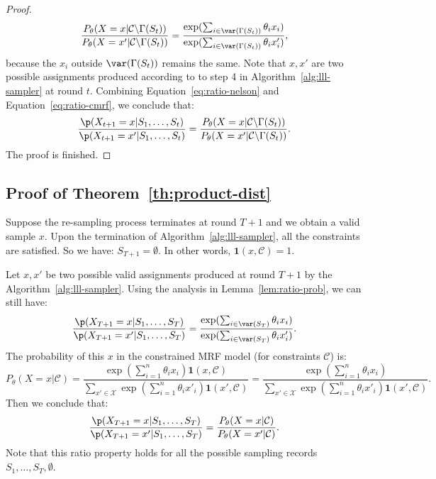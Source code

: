 \begin{lemma}
\begin{proof}
\begin{equation}
\begin{aligned}
\frac{P_{\theta}(X=x|\mathcal{C}\backslash \Gamma(S_t))}{P_{\theta}(X=x'|\mathcal{C}\backslash\Gamma(S_t))}=\frac{\exp(\sum_{i\in \var(\Gamma(S_t))}\theta_ix_i)}{\exp(\sum_{i\in \var(\Gamma(S_t))}\theta_ix'_i)},
\end{aligned}
\end{equation}
because the $x_i$ outside $\var(\Gamma(S_t))$ remains the same. Note that $x,x'$ are two possible assignments produced according to to step 4 in Algorithm~\ref{alg:lll-sampler} at round $t$. 
Combining Equation~\eqref{eq:ratio-nelson} and Equation~\eqref{eq:ratio-cmrf}, we conclude that:
\begin{equation*}
\begin{aligned}
\frac{\p(X_{t+1}=x|S_1,\ldots,S_t)}{\p(X_{t+1}=x'|S_1,\ldots,S_t)}=\frac{P_{\theta}(X=x|\mathcal{C}\backslash \Gamma(S_t))}{P_{\theta}(X=x'|\mathcal{C}\backslash\Gamma(S_t))}.
\end{aligned}
\end{equation*}
The proof is finished. 
\end{proof}
\end{lemma}

\subsection{Proof of Theorem~\ref{th:product-dist}}
Suppose the re-sampling process terminates at round $T+1$ and we obtain a valid sample $x$. Upon the termination of Algorithm~\ref{alg:lll-sampler}, all the constraints are satisfied. So we have: $S_{T+1}=\emptyset$. In other words, $\mathbf{1}(x,\mathcal{C})=1$. 

Let $x,x'$ be two possible valid assignments produced at round $T+1$ by the Algorithm~\ref{alg:lll-sampler}. Using the analysis in Lemma~\ref{lem:ratio-prob}, we can still have:
\begin{equation*}
\frac{\p(X_{T+1}=x|S_1,\ldots, S_T)}{\p(X_{T+1}=x'|S_1,\ldots, S_T)}=\frac{\exp(\sum_{i\in\var(S_T)}\theta_ix_i)}{\exp(\sum_{i\in\var(S_T)}\theta_ix'_i)}.
\end{equation*}
The probability of this $x$ in the constrained MRF model  (for constraints  $\mathcal{C}$) is:
\begin{equation*}
P_{\theta}(X=x|\mathcal{C})=\frac{\exp(\sum_{i=1}^n\theta_i x_i)\mathbf{1}(x,\mathcal{C})}{\sum_{x'\in\mathcal{X}}  \exp(\sum_{i=1}^n\theta_i x'_i)\mathbf{1}\left(x',\mathcal{C}\right)}
=\frac{\exp(\sum_{i=1}^n\theta_i x_i)}{\sum_{x'\in\mathcal{X}}  \exp(\sum_{i=1}^n\theta_i x'_i)\mathbf{1}\left(x',\mathcal{C}\right)}.
\end{equation*}
Then we conclude that:
\begin{equation*}
\frac{\p(X_{T+1}=x|S_1,\ldots, S_T)}{\p(X_{T+1}=x'|S_1,\ldots, S_T)}=\frac{P_{\theta}(X=x|\mathcal{C})}{P_{\theta}(X=x'|\mathcal{C})}.
\end{equation*}
Note that this ratio property holds for all the possible sampling records $S_1,\ldots, S_T,\emptyset$.


